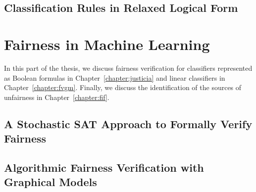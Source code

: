 \documentclass[12pt]{report}
\begin{document}
			\chapter{Classification Rules in Relaxed Logical Form}
%				
				
%				
%				
				
				
				
				
				
%				
%			
%
%
%
\part{Fairness in Machine Learning}

In this part of the thesis, we discuss fairness verification for classifiers represented as Boolean formulas in Chapter~\ref{chapter:justicia} and linear classifiers in Chapter~\ref{chapter:fvgm}. Finally, we discuss the identification of the sources of unfairness in Chapter~\ref{chapter:fif}.
%	
%		

			\chapter{A Stochastic SAT Approach to Formally Verify Fairness}
%				
				
%				
				
				
				
				
%				
%				
			\chapter{Algorithmic Fairness Verification with Graphical Models}
%				
				
%				
				
				
				
				
				
%				
%				
\end{document}
